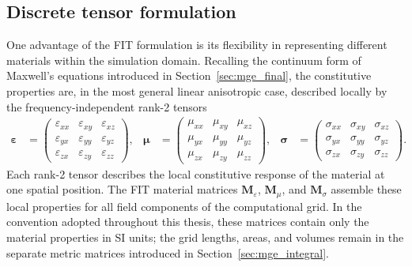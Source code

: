 \subsection{ Discrete tensor formulation}
One advantage of the FIT formulation is its flexibility in representing different materials within the simulation domain. Recalling the continuum form of Maxwell's equations introduced in Section~\ref{sec:mge_final}, the constitutive properties are, in the most general linear anisotropic case, described locally by the frequency-independent rank-2 tensors
%
\begin{equation}
\begin{aligned}
\boldsymbol{\varepsilon}
&=
\begin{pmatrix}
\varepsilon_{xx} & \varepsilon_{xy} & \varepsilon_{xz} \\
\varepsilon_{yx} & \varepsilon_{yy} & \varepsilon_{yz} \\
\varepsilon_{zx} & \varepsilon_{zy} & \varepsilon_{zz}
\end{pmatrix},
&
\boldsymbol{\mu}
&=
\begin{pmatrix}
\mu_{xx} & \mu_{xy} & \mu_{xz} \\
\mu_{yx} & \mu_{yy} & \mu_{yz} \\
\mu_{zx} & \mu_{zy} & \mu_{zz}
\end{pmatrix},
&
\boldsymbol{\sigma}
&=
\begin{pmatrix}
\sigma_{xx} & \sigma_{xy} & \sigma_{xz} \\
\sigma_{yx} & \sigma_{yy} & \sigma_{yz} \\
\sigma_{zx} & \sigma_{zy} & \sigma_{zz}
\end{pmatrix}.
\end{aligned}
\label{eq:material_tensors}
\end{equation}
%
Each rank-2 tensor describes the local constitutive response of the material at one spatial position. The FIT material matrices $\mathbf{M}_{\varepsilon}$, $\mathbf{M}_{\mu}$, and $\mathbf{M}_{\sigma}$ assemble these local properties for all field components of the computational grid. In the convention adopted throughout this thesis, these matrices contain only the material properties in SI units; the grid lengths, areas, and volumes remain in the separate metric matrices introduced in Section~\ref{sec:mge_integral}.

